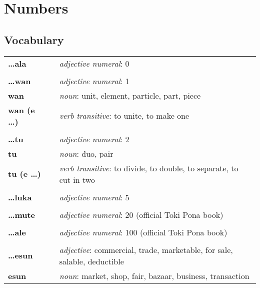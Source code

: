 \section{Numbers}
%
%
\subsection*{Vocabulary}
%
\begin{supertabular}{p{2,5cm}|ll}
%
\textbf{\dots ala} && \textit{adjective numeral}: 0 \\ %
 && \\ %
%
\textbf{\dots wan} && \textit{adjective numeral}: 1 \\ %
\textbf{wan} && \textit{noun}: unit, element, particle, part, piece \\ %
\textbf{wan (e \dots)} && \textit{verb transitive}: to unite, to make one \\ %
 && \\ %
%
\textbf{\dots tu} && \textit{adjective numeral}: 2 \\ %
\textbf{tu} && \textit{noun}: duo, pair \\ %
\textbf{tu (e \dots)} && \textit{verb transitive}: to divide, to double, to separate, to cut in two \\ %
 && \\ %
%
\textbf{\dots luka} && \textit{adjective numeral}: 5 \\ %
 && \\ %
%
\textbf{\dots mute} && \textit{adjective numeral}: 20 (official Toki Pona book) \\ %
 && \\ %
%
\textbf{\dots ale} && \textit{adjective numeral}: 100 (official Toki Pona book) \\ %
 && \\ %
%
\textbf{\dots esun} && \textit{adjective}: commercial, trade, marketable, for sale, salable, deductible \\  %
\textbf{esun} && \textit{noun}: market, shop, fair, bazaar, business, transaction \\ %

\end{supertabular}
